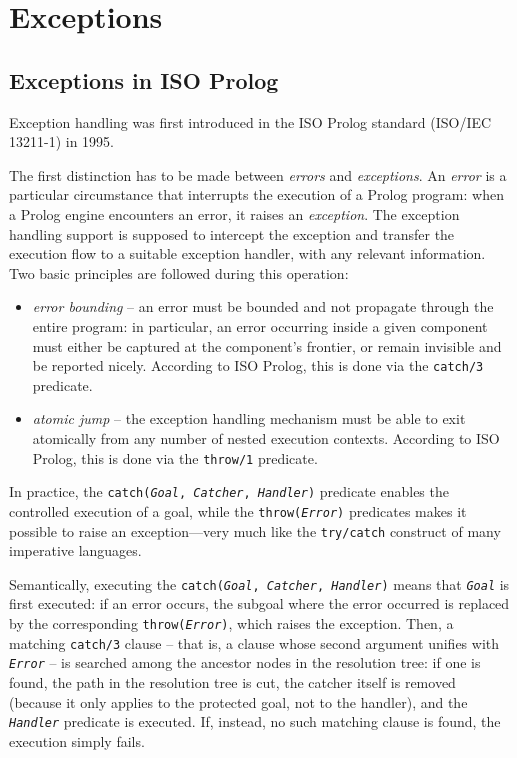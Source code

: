 \chapter{\tuprolog{} Exceptions}
\label{ch:exceptions}

\section{Exceptions in ISO Prolog}
\label{sec:exceptions in ISO prolog}
Exception handling was first introduced in the ISO Prolog standard (ISO/IEC 13211-1) in 1995.

The first distinction has to be made between \textit{errors} and \textit{exceptions}. 
%
An \textit{error} is a particular circumstance that interrupts the execution of a Prolog program: when a Prolog engine encounters an error, it raises an \textit{exception}. 
%
The exception handling support is supposed to intercept the exception and transfer the execution flow to a suitable exception handler, with any relevant information. Two basic principles are followed during this operation:

\begin{itemize}
  \item \textit{error bounding} -- an error must be bounded and not propagate through the entire program: in particular, an error occurring inside a given component must either be captured at the component's frontier, or remain invisible and be reported nicely.
      According to ISO Prolog, this is done via the \texttt{catch/3} predicate.

  \item \textit{atomic jump} -- the exception handling mechanism must be able to exit atomically from any number of nested execution contexts. According to ISO Prolog, this is done via the \texttt{throw/1} predicate.
\end{itemize}
%
In practice, the \texttt{catch(\textit{Goal}, \textit{Catcher}, \textit{Handler})} predicate enables the controlled execution of a goal, while the \texttt{throw(\textit{Error})} predicates makes it possible to raise an exception---very much like the \texttt{try/catch} construct of many imperative languages.

Semantically, executing the \texttt{catch(\textit{Goal}, \textit{Catcher}, \textit{Handler})} means that \texttt{\textit{Goal}} is first executed: if an error occurs, the subgoal where the error occurred is replaced by the corresponding \texttt{throw(\textit{Error})}, which raises the exception.
%
Then, a matching \texttt{catch/3} clause -- that is, a clause whose second argument
unifies with \texttt{\textit{Error}} -- is searched among the ancestor nodes in the resolution tree: if one is found, the path in the resolution tree is cut, the catcher itself is removed (because it only applies to the protected goal, not to the handler), and the \texttt{\textit{Handler}} predicate is executed. If, instead, no such matching clause is found, the execution simply fails.

